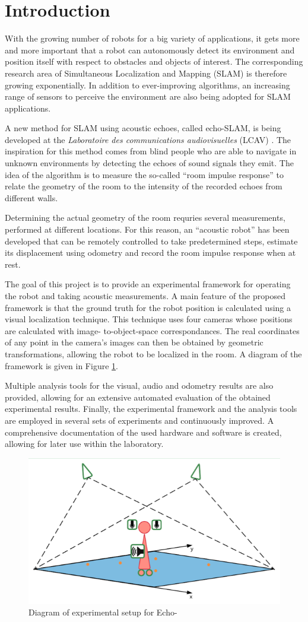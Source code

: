 \section{Introduction}

\setlength{\parskip}{1em}

With the growing number of robots for a big variety of applications, it gets more and more important that a robot can autonomously detect its environment and position itself with respect to obstacles and objects of interest. 
The corresponding research area of Simultaneous Localization and Mapping (SLAM) is therefore growing exponentially. 
In addition to ever-improving algorithms, an increasing range of sensors to perceive the environment are also being adopted for SLAM applications. 

A new method for SLAM using acoustic echoes, called echo-SLAM, is being developed at the \textit{Laboratoire des communications audiovisuelles} (LCAV) \cite{Miranda}. The inspiration for this method comes from blind people who are able to navigate in unknown environments by detecting the echoes of sound signals they emit. The idea of the algorithm is to measure the so-called ``room impulse response'' to relate the geometry of the room to the intensity of the recorded echoes from different walls. 

Determining the actual geometry of the room requries several measurements, performed at different locations. 
For this reason, an ``acoustic robot'' has been developed that can be remotely controlled to take predetermined steps, estimate its displacement using odometry and record the room impulse response when at rest. 

The goal of this project is to provide an experimental framework for operating the robot and taking acoustic measurements. 
A main feature of the proposed framework is that the ground truth for the robot position is calculated using a visual localization technique. 
This technique uses four cameras whose positions are calculated with image- to-object-space correspondances. 
The real coordinates of any point in the camera's images can then be obtained by geometric transformations, allowing the robot to be localized in the room.
A diagram of the framework is given in Figure \ref{fig:setup}. 

Multiple analysis tools for the visual, audio and odometry results are also provided, allowing for an extensive automated evaluation of the obtained experimental results. 
Finally, the experimental framework and the analysis tools are employed in several sets of experiments and continuously improved. A comprehensive documentation of the used hardware and software is created, allowing for later use within the laboratory.  


\begin{figure}[b]
    \centering
    \includegraphics[width=.6\linewidth]{files/Setup.png}
    \caption{Diagram of experimental setup for Echo-}
    \label{fig:setup}
\end{figure}
